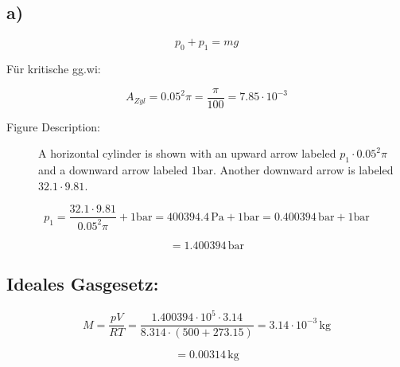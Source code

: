 

\subsection*{a)}

\[ p_0 + p_1 = mg \]

Für kritische gg.wi:

\[
A_{Zyl} = 0.05^2 \pi = \frac{\pi}{100} = 7.85 \cdot 10^{-3}
\]

\begin{description}
    \item[Figure Description:] A horizontal cylinder is shown with an upward arrow labeled \( p_1 \cdot 0.05^2 \pi \) and a downward arrow labeled \( 1 \text{bar} \). Another downward arrow is labeled \( 32.1 \cdot 9.81 \).
\end{description}

\[
p_1 = \frac{32.1 \cdot 9.81}{0.05^2 \pi} + 1 \text{bar} = 400394.4 \, \text{Pa} + 1 \text{bar} = 0.400394 \, \text{bar} + 1 \text{bar}
\]

\[
= 1.400394 \, \text{bar}
\]

\subsection*{Ideales Gasgesetz:}

\[
M = \frac{pV}{RT} = \frac{1.400394 \cdot 10^5 \cdot 3.14}{8.314 \cdot (500 + 273.15)} = 3.14 \cdot 10^{-3} \, \text{kg}
\]

\[
= 0.00314 \, \text{kg}
\]